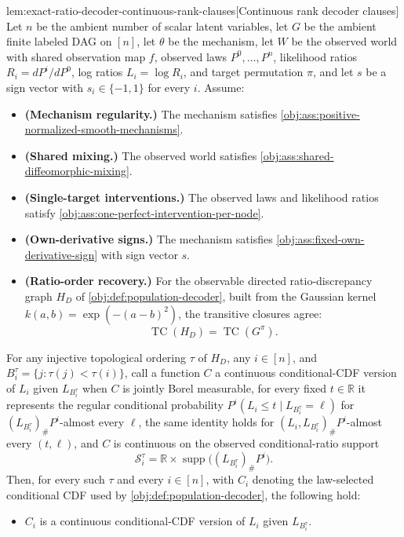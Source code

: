 \begin{lemmav}{lem:exact-ratio-decoder-continuous-rank-clauses}[Continuous rank decoder clauses]
Let \(n\) be the ambient number of scalar latent variables, let \(G\) be the ambient finite labeled DAG on \([n]\), let \(\theta\) be the mechanism, let \(W\) be the observed world with shared observation map \(f\), observed laws \(P^0,\ldots,P^n\), likelihood ratios \(R_i=dP^i/dP^0\), log ratios \(L_i=\log R_i\), and target permutation \(\pi\), and let \(s\) be a sign vector with \(s_i\in\{-1,1\}\) for every \(i\). Assume:
\begin{itemize}
\item \textbf{(Mechanism regularity.)} The mechanism satisfies \cref{obj:ass:positive-normalized-smooth-mechanisms}.
\item \textbf{(Shared mixing.)} The observed world satisfies \cref{obj:ass:shared-diffeomorphic-mixing}.
\item \textbf{(Single-target interventions.)} The observed laws and likelihood ratios satisfy \cref{obj:ass:one-perfect-intervention-per-node}.
\item \textbf{(Own-derivative signs.)} The mechanism satisfies \cref{obj:ass:fixed-own-derivative-sign} with sign vector \(s\).
\item \textbf{(Ratio-order recovery.)} For the observable directed ratio-discrepancy graph \(H_D\) of \cref{obj:def:population-decoder}, built from the Gaussian kernel \(k(a,b)=\exp(-(a-b)^2)\), the transitive closures agree:
\[
\operatorname{TC}(H_D)=\operatorname{TC}(G^\pi).
\]
\end{itemize}
For any injective topological ordering \(\tau\) of \(H_D\), any \(i\in[n]\), and \(B_i^\tau=\{j:\tau(j)<\tau(i)\}\), call a function \(C\) a continuous conditional-CDF version of \(L_i\) given \(L_{B_i^\tau}\) when \(C\) is jointly Borel measurable, for every fixed \(t\in\mathbb R\) it represents the regular conditional probability \(P^i(L_i\le t\mid L_{B_i^\tau}=\ell)\) for \((L_{B_i^\tau})_{\#}P^i\)-almost every \(\ell\), the same identity holds for \((L_i,L_{B_i^\tau})_{\#}P^i\)-almost every \((t,\ell)\), and \(C\) is continuous on the observed conditional-ratio support
\[
\mathcal S_i^\tau=\mathbb R\times\operatorname{supp}\bigl((L_{B_i^\tau})_{\#}P^i\bigr).
\]
Then, for every such \(\tau\) and every \(i\in[n]\), with \(C_i\) denoting the law-selected conditional CDF used by \cref{obj:def:population-decoder}, the following hold:
\begin{itemize}
\item \(C_i\) is a continuous conditional-CDF version of \(L_i\) given \(L_{B_i^\tau}\).

\end{itemize}
\end{lemmav}
